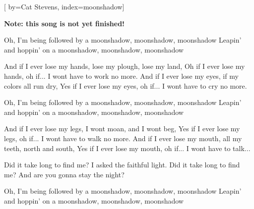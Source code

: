 
[%
    by={Cat Stevens},
    index={moonshadow}]


    \label{moonshadow}

    \textbf{Note: this song is not yet finished!}

    \beginverse
        Oh, I'm being followed by a moonshadow, moonshadow, moonshadow
        Leapin' and hoppin' on a moonshadow, moonshadow, moonshadow

        And if I ever lose my hands, lose my plough, lose my land,
        Oh if I ever lose my hands, oh if... I wont have to work no more.
        And if I ever lose my eyes, if my colors all run dry,
        Yes if I ever lose my eyes, oh if... I wont have to cry no more.


        Oh, I'm being followed by a moonshadow, moonshadow, moonshadow
        Leapin' and hoppin' on a moonshadow, moonshadow, moonshadow

        And if I ever lose my legs, I wont moan, and I wont beg,
        Yes if I ever lose my legs, oh if... I wont have to walk no more.
        And if I ever lose my mouth, all my teeth, north and south,
        Yes if I ever lose my mouth, oh if... I wont have to talk...

        Did it take long to find me? I asked the faithful light.
        Did it take long to find me? And are you gonna stay the night?

        Oh, I'm being followed by a moonshadow, moonshadow, moonshadow
        Leapin' and hoppin' on a moonshadow, moonshadow, moonshadow
    \endverse
\endsong

